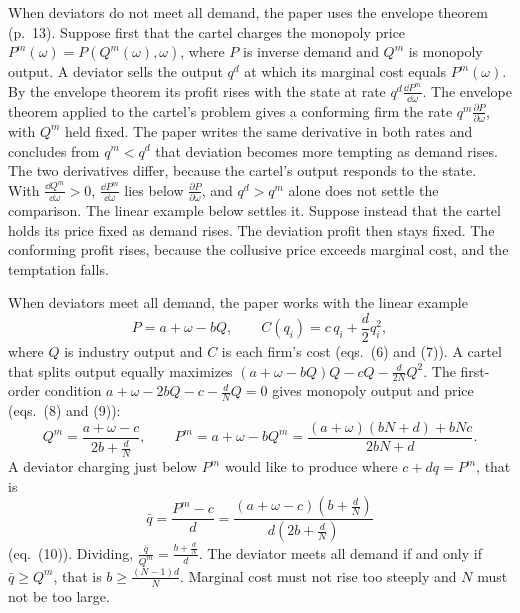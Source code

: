 When deviators do not meet all demand, the paper uses the envelope theorem (p.~13). Suppose first that the cartel
charges the monopoly price $P^m(\omega) = P(Q^m(\omega), \omega)$, where $P$ is inverse demand and $Q^m$ is monopoly
output. A deviator sells the output $q^d$ at which its marginal cost equals $P^m(\omega)$. By the envelope theorem
its profit rises with the state at rate $q^d\frac{\dd P^m}{\dd\omega}$. The envelope theorem applied to the cartel's
problem gives a conforming firm the rate $q^m\frac{\partial P}{\partial \omega}$, with $Q^m$ held fixed. The paper
writes the same derivative in both rates and concludes from $q^m < q^d$ that deviation becomes more tempting as demand
rises. The two derivatives differ, because the cartel's output responds to the state. With
$\frac{\dd Q^m}{\dd\omega} > 0$, $\frac{\dd P^m}{\dd\omega}$ lies below $\frac{\partial P}{\partial\omega}$, and
$q^d > q^m$ alone does not settle the comparison. The linear example below settles it. Suppose instead that the
cartel holds its price fixed as demand rises. The deviation profit then stays fixed. The conforming profit rises,
because the collusive price exceeds marginal cost, and the temptation falls.

When deviators meet all demand, the paper works with the linear example
\begin{equation}\label{eq:12-rs-linear}
P = a + \omega - bQ, \qquad C(q_i) = c\,q_i + \frac{d}{2}q_i^2,
\end{equation}
where $Q$ is industry output and $C$ is each firm's cost (eqs.~(6) and (7)). A cartel that splits output equally
maximizes $(a + \omega - bQ)Q - cQ - \frac{d}{2N}Q^2$. The first-order condition $a + \omega - 2bQ - c - \frac{d}{N}Q = 0$
gives monopoly output and price (eqs.~(8) and (9)):
\begin{equation*}
Q^m = \frac{a + \omega - c}{2b + \frac{d}{N}}, \qquad
P^m = a + \omega - bQ^m = \frac{(a+\omega)(bN + d) + bNc}{2bN + d}.
\end{equation*}
A deviator charging just below $P^m$ would like to produce where $c + dq = P^m$, that is
\begin{equation*}
\bar q = \frac{P^m - c}{d} = \frac{(a + \omega - c)\left(b + \frac{d}{N}\right)}{d\left(2b + \frac{d}{N}\right)}
\end{equation*}
(eq.~(10)). Dividing, $\frac{\bar q}{Q^m} = \frac{b + \frac{d}{N}}{d}$. The deviator meets all demand if and only if
$\bar q \ge Q^m$, that is $b \ge \frac{(N-1)d}{N}$. Marginal cost must not rise too steeply and $N$ must not be too large.

